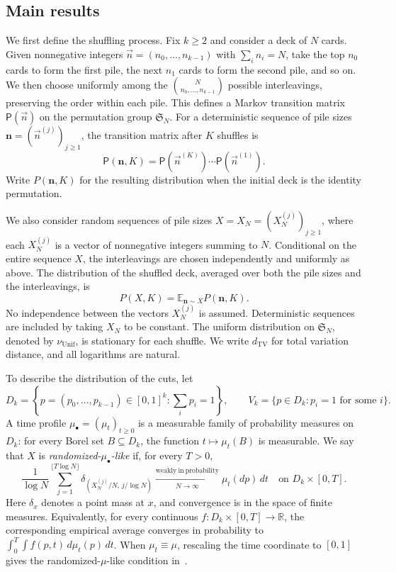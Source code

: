 \documentclass[11pt]{article}
\numberwithin{equation}{section}
\theoremstyle{definition}
\theoremstyle{remark}
\newcommand{\E}{\mathbb E}
\newcommand{\TV}{\mathrm{TV}}
\newcommand{\Unif}{\mathrm{Unif}}
\newcommand{\dTV}{d_{\TV}}
\newcommand{\nuUnif}{\nu_{\Unif}}
\newcommand{\1}{\mathbf 1}
\begin{document}
\subsection{Main results}

We first define the shuffling process. Fix $k\ge2$ and consider a deck
of $N$ cards. Given nonnegative integers $\vec n=(n_0,\ldots,n_{k-1})$
with $\sum_i n_i=N$, take the top $n_0$ cards to form the first pile,
the next $n_1$ cards to form the second pile, and so on. We then choose
uniformly among the $\binom{N}{n_0,\ldots,n_{k-1}}$ possible interleavings,
preserving the order within each pile. This defines a Markov transition
matrix $\mathsf P(\vec n)$ on the permutation group $\mathfrak S_N$.
For a deterministic sequence of pile sizes
$\mathbf n=(\vec n^{(j)})_{j\ge1}$, the transition matrix after $K$
shuffles is
\[
 \mathsf P(\mathbf n,K)
 =\mathsf P(\vec n^{(K)})\cdots\mathsf P(\vec n^{(1)}).
\]
Write $P(\mathbf n,K)$ for the resulting distribution when the initial
deck is the identity permutation.

We also consider random sequences of pile sizes
$X=X_N=(X_N^{(j)})_{j\ge1}$, where each $X_N^{(j)}$ is a vector of
nonnegative integers summing to $N$. Conditional on the entire sequence
$X$, the interleavings are chosen independently and uniformly as above.
The distribution of the shuffled deck, averaged over both the pile sizes
and the interleavings, is
\begin{equation}\label{eq:random-shuffle-law}
 P(X,K)=\E_{\mathbf n\sim X}P(\mathbf n,K).
\end{equation}
No independence between the vectors $X_N^{(j)}$ is assumed. Deterministic
sequences are included by taking $X_N$ to be constant. The uniform
distribution on $\mathfrak S_N$, denoted by $\nuUnif$, is stationary for
each shuffle. We write $\dTV$ for total variation distance, and all
logarithms are natural.

To describe the distribution of the cuts, let
\begin{equation}\label{eq:intro-simplex}
 D_k=\left\{p=(p_0,\ldots,p_{k-1})\in[0,1]^k:\sum_i p_i=1\right\},
 \qquad
 V_k=\{p\in D_k:p_i=1\text{ for some }i\}.
\end{equation}
A time profile $\mu_\bullet=(\mu_t)_{t\ge0}$ is a measurable family of
probability measures on $D_k$: for every Borel set $B\subseteq D_k$,
the function $t\mapsto\mu_t(B)$ is measurable. We say that $X$ is
\emph{randomized-$\mu_\bullet$-like} if, for every $T>0$,
\begin{equation}\label{eq:randomized-profile-like}
 \frac1{\log N}\sum_{j=1}^{\lfloor T\log N\rfloor}
       \delta_{(X_N^{(j)}/N,\,j/\log N)}
 \xrightarrow[N\to\infty]{\mathrm{weakly\ in\ probability}}
       \mu_t(dp)\,dt
 \quad\text{on }D_k\times[0,T].
\end{equation}
Here $\delta_x$ denotes a point mass at $x$, and convergence is in the
space of finite measures. Equivalently, for every continuous
$f:D_k\times[0,T]\to\mathbb R$, the corresponding empirical average
converges in probability to $\int_0^T\int f(p,t)\,d\mu_t(p)\,dt$.
When $\mu_t\equiv\mu$, rescaling the time coordinate to $[0,1]$ gives
the randomized-$\mu$-like condition in~\cite{SSW}.
\end{document}
